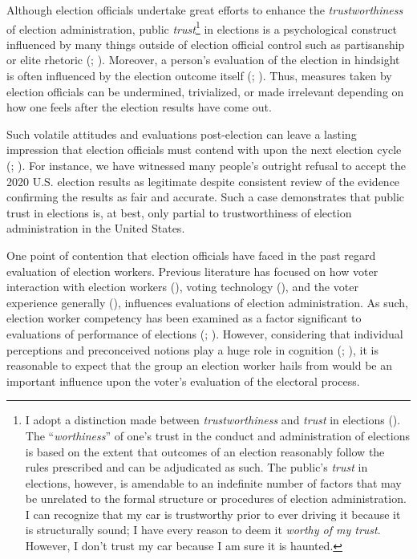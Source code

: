 \documentclass[
  12pt,
  letterpaper,
]{article}
\begin{document}
Although election officials undertake great efforts to enhance the
\emph{trustworthiness} of election administration, public
\emph{trust}\footnote{I adopt a distinction made between
  \emph{trustworthiness} and \emph{trust} in elections
  (). The ``\emph{worthiness}''
  of one's trust in the conduct and administration of elections is based
  on the extent that outcomes of an election reasonably follow the rules
  prescribed and can be adjudicated as such. The public's \emph{trust}
  in elections, however, is amendable to an indefinite number of factors
  that may be unrelated to the formal structure or procedures of
  election administration. I can recognize that my car is trustworthy
  prior to ever driving it because it is structurally sound; I have
  every reason to deem it \emph{worthy of my trust}. However, I don't
  trust my car because I am sure it is haunted.} in elections is a
psychological construct influenced by many things outside of election
official control such as partisanship or elite rhetoric
(;
). Moreover, a
person's evaluation of the election in hindsight is often influenced by
the election outcome itself (; ). Thus, measures
taken by election officials can be undermined, trivialized, or made
irrelevant depending on how one feels after the election results have
come out.

Such volatile attitudes and evaluations post-election can leave a
lasting impression that election officials must contend with upon the
next election cycle (;
). For instance, we
have witnessed many people's outright refusal to accept the 2020 U.S.
election results as legitimate despite consistent review of the evidence
confirming the results as fair and accurate. Such a case demonstrates
that public trust in elections is, at best, only partial to
trustworthiness of election administration in the United States.

One point of contention that election officials have faced in the past
regard evaluation of election workers. Previous literature has focused
on how voter interaction with election workers
(), voting technology
(), and the
voter experience generally (), influences evaluations of election administration. As
such, election worker competency has been examined as a factor
significant to evaluations of performance of elections
(;
).
However, considering that individual perceptions and preconceived
notions play a huge role in cognition (; ), it is reasonable to expect that the group an election worker
hails from would be an important influence upon the voter's evaluation
of the electoral process.
\end{document}
